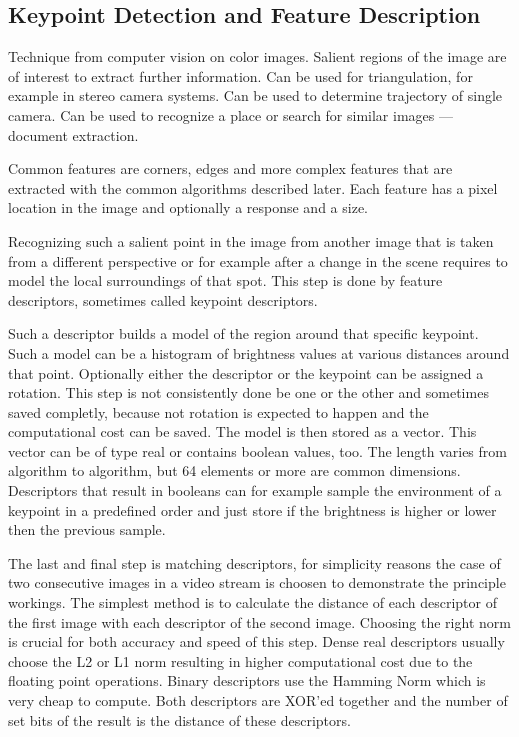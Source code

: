 \subsection{Keypoint Detection and Feature Description}

Technique from computer vision on color images.
Salient regions of the image are of interest to extract further information.
Can be used for triangulation, for example in stereo camera systems.
Can be used to determine trajectory of single camera.
Can be used to recognize a place or search for similar images --- document extraction.

Common features are corners, edges and more complex features that are extracted with the common algorithms described later.
Each feature has a pixel location in the image and optionally a response and a size.

Recognizing such a salient point in the image from another image that is taken from a different perspective or for example after a change in the scene requires to model the local surroundings of that spot.
This step is done by feature descriptors, sometimes called keypoint descriptors.

Such a descriptor builds a model of the region around that specific keypoint.
Such a model can be a histogram of brightness values at various distances around that point.
Optionally either the descriptor or the keypoint can be assigned a rotation.
This step is not consistently done be one or the other and sometimes saved completly, because not rotation is expected to happen and the computational cost can be saved.
The model is then stored as a vector.
This vector can be of type real or contains boolean values, too.
The length varies from algorithm to algorithm, but 64 elements or more are common dimensions.
Descriptors that result in booleans can for example sample the environment of a keypoint in a predefined order and just store if the brightness is higher or lower then the previous sample.

The last and final step is matching descriptors, for simplicity reasons the case of two consecutive images in a video stream is choosen to demonstrate the principle workings.
The simplest method is to calculate the distance of each descriptor of the first image with each descriptor of the second image.
Choosing the right norm is crucial for both accuracy and speed of this step.
Dense real descriptors usually choose the L2 or L1 norm resulting in higher computational cost due to the floating point operations.
Binary descriptors use the Hamming Norm which is very cheap to compute.
Both descriptors are XOR'ed together and the number of set bits of the result is the distance of these descriptors.

